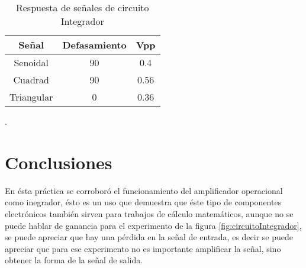 \documentclass{article}
\begin{document}
\begin{table}[h!]
\centering

\begin{tabular}{|c|c|c|}
\hline
Señal      & Defasamiento & Vpp  \\ \hline
Senoidal   & 90           & 0.4  \\ \hline
Cuadrad    & 90           & 0.56 \\ \hline
Triangular & 0            & 0.36 \\ \hline
\end{tabular}

\caption{Respuesta de señales de circuito Integrador}
\label{senyalIntegrador}

\end{table}

.\\[10cm]

\section{Conclusiones}

En ésta práctica se corroboró el funcionamiento del amplificador operacional como inegrador, ésto es un uso que demuestra que éste tipo de componentes electrónicos también sirven para trabajos de cálculo matemáticos, aunque no se puede hablar de ganancia para el experimento de la figura \ref{fig:circuitoIntegrador}, se puede apreciar que hay una pérdida en la señal de entrada, es decir se puede apreciar que para ese experimento no es importante amplificar la señal, sino obtener la forma de la señal de salida.



\end{document}
